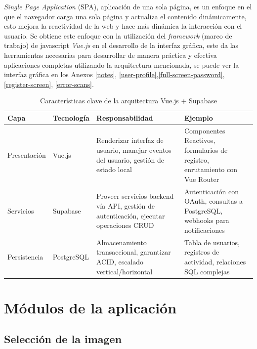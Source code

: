 \textit{Single Page Application} (SPA), aplicaci\'on de una sola p\'agina, es un enfoque en el que el navegador carga una sola p\'agina y actualiza el contenido din\'amicamente, esto mejora la reactividad de la web y hace m\'as din\'amica la interacci\'on con el usuario. Se obtiene este enfoque con la utilizaci\'on del \textit{framework} (marco de trabajo) de javascript \textit{Vue.js} \cite{vuejs} en el desarrollo de la interfaz gr\'afica, este  da las herramientas necesarias para desarrollar de manera pr\'actica y efectiva aplicaciones completas utilizando la arquitectura mencionada, se puede ver la interfaz gr\'afica en los Anexos \ref{notes}, \ref{user-profile},\ref{full-screen-password}, \ref{register-screen}, \ref{error-scans}.


\begin{table}[ht]
	\centering
	\caption{Características clave de la arquitectura Vue.js + Supabase}
	\label{tab:arquitectura}
	\begin{tabular}{|p{2.1cm}|p{2cm}|p{5cm}|p{5cm}|} %
		\hline
		\rowcolor{gray!20} %
		\textbf{Capa} & \textbf{Tecnología} & \textbf{Responsabilidad} & \textbf{Ejemplo} \\
		\hline
		
		Presentación & Vue.js & 
		Renderizar interfaz de usuario, manejar eventos del usuario, gestión de estado local & 
		Componentes Reactivos, formularios de registro, enrutamiento con Vue Router \\
		\hline
		
		Servicios & Supabase & 
		Proveer servicios backend vía API, gestión de autenticación, ejecutar operaciones CRUD & 
		Autenticación con OAuth, consultas a PostgreSQL, webhooks para notificaciones \\
		\hline
		
		Persistencia & PostgreSQL & 
		Almacenamiento transaccional, garantizar ACID, escalado vertical/horizontal & 
		Tabla de usuarios, registros de actividad, relaciones SQL complejas \\
		\hline
	\end{tabular}
\end{table}


\section{M\'odulos de la aplicaci\'on}

\subsection{Selección de la imagen}
\label{subsec:seleccion-imagen}

